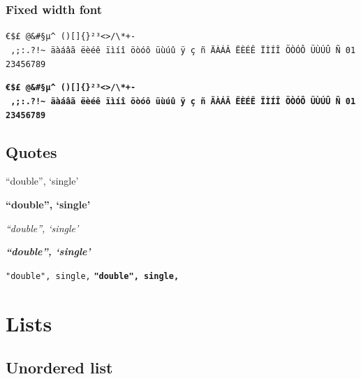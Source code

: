 \documentclass[twoside]{extreport}
\begin{document}
\hypertarget{fixed-width-font}{%
\subsection{Fixed width font}\label{fixed-width-font}}

\texttt{€\$£\ @\&\#§µ\^{}\ (){[}{]}\{\}\textbar{}²³\textless{}\textgreater{}/\textbackslash{}*+-\ ,;:.?!\textasciitilde{}\ äàáâã\ ëèéê\ ïìíî\ öòóô\ üùúû\ ÿ\ ç\ ñ\ ÄÀÁÂ\ ËÈÉÊ\ ÏÌÍÎ\ ÖÒÓÔ\ ÜÙÚÛ\ Ñ\ 0123456789}

\textbf{\texttt{€\$£\ @\&\#§µ\^{}\ (){[}{]}\{\}\textbar{}²³\textless{}\textgreater{}/\textbackslash{}*+-\ ,;:.?!\textasciitilde{}\ äàáâã\ ëèéê\ ïìíî\ öòóô\ üùúû\ ÿ\ ç\ ñ\ ÄÀÁÂ\ ËÈÉÊ\ ÏÌÍÎ\ ÖÒÓÔ\ ÜÙÚÛ\ Ñ\ 0123456789}}

\hypertarget{quotes}{%
\section{Quotes}\label{quotes}}

\begin{description}
\tightlist
\item[normal:]
``double'', `single'
\item[bold:]
\textbf{``double'', `single'}
\item[italics:]
\emph{``double'', `single'}
\item[bold italics:]
\textbf{\emph{``double'', `single'}}
\item[fix width font:]
\texttt{"double",\ \textquotesingle{}single\textquotesingle{},}
\textbf{\texttt{"double",\ \textquotesingle{}single\textquotesingle{},}}
\end{description}

\hypertarget{lists}{%
\chapter{Lists}\label{lists}}

\hypertarget{unordered-list}{%
\section{Unordered list}\label{unordered-list}}
\end{document}
